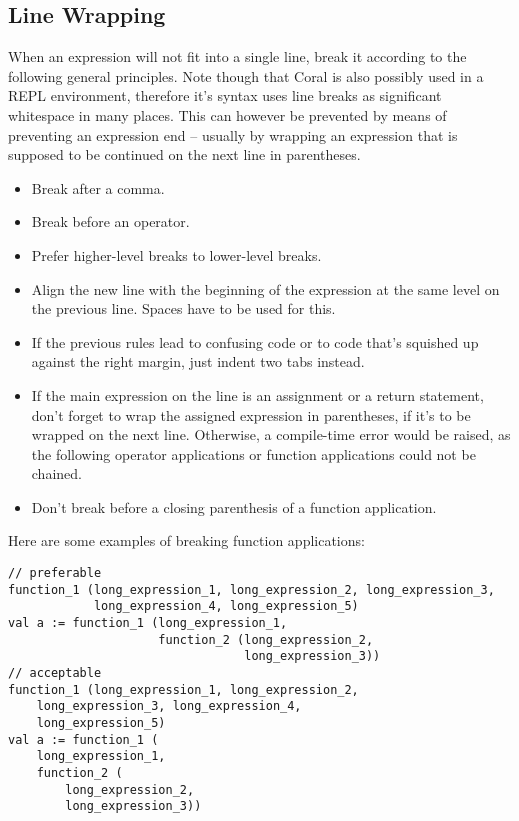 \subsection{Line Wrapping}

When an expression will not fit into a single line, break it according to the following general principles. Note though that Coral is also possibly used in a REPL environment, therefore it's syntax uses line breaks as significant whitespace in many places. This can however be prevented by means of preventing an expression end -- usually by wrapping an expression that is supposed to be continued on the next line in parentheses. 

\begin{itemize}
\item Break after a comma. 
\item Break before an operator. 
\item Prefer higher-level breaks to lower-level breaks. 
\item Align the new line with the beginning of the expression at the same level on the previous line. Spaces have to be used for this. 
\item If the previous rules lead to confusing code or to code that's squished up against the right margin, just indent two tabs instead. 
\item If the main expression on the line is an assignment or a return statement, don't forget to wrap the assigned expression in parentheses, if it's to be wrapped on the next line. Otherwise, a compile-time error would be raised, as the following operator applications or function applications could not be chained. 
\item Don't break before a closing parenthesis of a function application.  
\end{itemize}

\example Here are some examples of breaking function applications: 

\begin{lstlisting}
// preferable
function_1 (long_expression_1, long_expression_2, long_expression_3,
            long_expression_4, long_expression_5)
val a := function_1 (long_expression_1,
                     function_2 (long_expression_2,
                                 long_expression_3))
// acceptable
function_1 (long_expression_1, long_expression_2, 
    long_expression_3, long_expression_4, 
    long_expression_5)
val a := function_1 (
    long_expression_1,
    function_2 (
        long_expression_2,
        long_expression_3))
\end{lstlisting}

